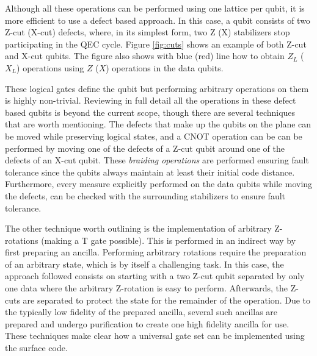 Although all these operations can be performed using one lattice per qubit,
it is more efficient to use a defect based approach. In this case, a qubit
consists of two Z-cut (X-cut) defects, where, in its simplest form, two Z (X)
stabilizers stop participating in the QEC cycle. Figure \ref{fig:cuts} shows an
example of both Z-cut and X-cut qubits. The figure also shows with blue
(red) line how to obtain $Z_L$ ($X_L$) operations using $Z$ ($X$) operations in
the data qubits.

These logical gates define the qubit but performing arbitrary operations on them
is highly non-trivial. Reviewing in full detail all the operations in these
defect based qubits is beyond the current scope, though there are several
techniques that are worth mentioning. The defects that make up the qubits on the
plane can be moved while preserving logical states, and a CNOT operation can be
can be performed by moving one of the defects of a Z-cut qubit around one of the
defects of an X-cut qubit. These \textit{braiding operations} are performed
ensuring fault tolerance since the qubits always maintain at least their initial
code distance. Furthermore, every measure explicitly performed on the data
qubits while moving the defects, can be checked with the surrounding stabilizers
to ensure fault tolerance.

The other technique worth outlining is the implementation of arbitrary
Z-rotations (making a T gate possible). This is performed in an indirect way by
first preparing an ancilla. Performing arbitrary rotations require the
preparation of an arbitrary state, which is by itself a challenging task. In
this case, the approach followed consists on starting with a two Z-cut qubit
separated by only one data where the arbitrary Z-rotation is easy to perform.
Afterwards, the Z-cuts are separated to protect the state for the
remainder of the operation. Due to the typically low fidelity of the prepared
ancilla, several such ancillas are prepared and undergo purification to create
one high fidelity ancilla for use. These techniques make clear how a universal
gate set can be implemented using the surface code.



